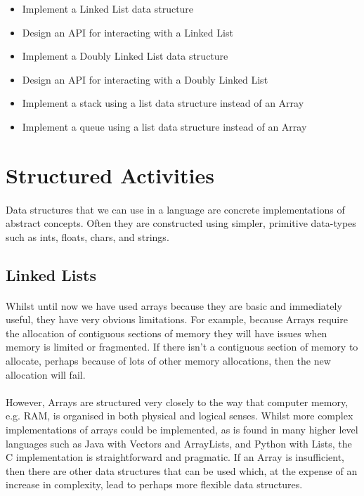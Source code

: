 \documentclass[10pt, a4paper, twosize]{article}
\begin{document}
\begin{itemize}
\item Implement a Linked List data structure
\item Design an API for interacting with a Linked List
\item Implement a Doubly Linked List data structure
\item Design an API for interacting with a Doubly Linked List
\item Implement a stack using a list data structure instead of an Array
\item Implement a queue using a list data structure instead of an Array
\end{itemize}


\section{Structured Activities}

\paragraph{} Data structures that we can use in a language are concrete implementations of abstract concepts. Often they are constructed using simpler, primitive data-types such as ints, floats, chars, and strings. 

\subsection{Linked Lists}
\paragraph{}  Whilst until now we have used arrays because they are basic and immediately useful, they have very obvious limitations. For example, because Arrays require the allocation of contiguous sections of memory they will have issues when memory is limited or fragmented. If there isn't a contiguous section of memory to allocate, perhaps because of lots of other memory allocations, then the new allocation will fail.

\paragraph{} However, Arrays are structured very closely to the way that computer memory, e.g. RAM, is organised in both physical and logical senses. Whilst more complex implementations of arrays could be implemented, as is found in many higher level languages such as Java with Vectors and ArrayLists, and Python with Lists, the C implementation is straightforward and pragmatic. If an Array is insufficient, then there are other data structures that can be used which, at the expense of an increase in complexity, lead to perhaps more flexible data structures.
\end{document}

